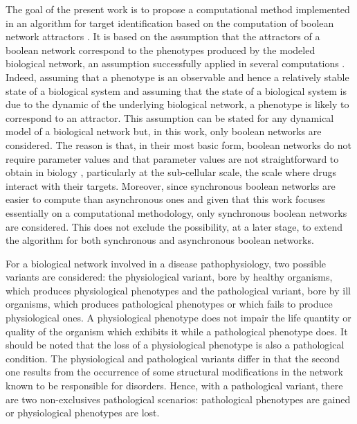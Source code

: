 \documentclass[oneside,a4paper,onecolumn,notitlepage]{article}
\begin{document}
The goal of the present work is to propose a computational method implemented in an algorithm for target identification based on the computation of boolean network attractors \cite{bornholdt2008boolean}. It is based on the assumption that the attractors of a boolean network correspond to the phenotypes produced by the modeled biological network, an assumption successfully applied in several computations \cite{huang2000shape,davidich2008boolean,faure2006dynamical,fumia2013boolean,creixell2012navigating,baverstock2011comparison}. Indeed, assuming that a phenotype is an observable and hence a relatively stable state of a biological system and assuming that the state of a biological system is due to the dynamic of the underlying biological network, a phenotype is likely to correspond to an attractor. This assumption can be stated for any dynamical model of a biological network but, in this work, only boolean networks are considered. The reason is that, in their most basic form, boolean networks do not require parameter values and that parameter values are not straightforward to obtain in biology \cite{wynn2012logic}, particularly at the sub-cellular scale, the scale where drugs interact with their targets. Moreover, since synchronous boolean networks are easier to compute than asynchronous ones \cite{garg2008synchronous} and given that this work focuses essentially on a computational methodology, only synchronous boolean networks are considered. This does not exclude the possibility, at a later stage, to extend the algorithm for both synchronous and asynchronous boolean networks.

For a biological network involved in a disease pathophysiology, two possible variants are considered: the physiological variant, bore by healthy organisms, which produces physiological phenotypes and the pathological variant, bore by ill organisms, which produces pathological phenotypes or which fails to produce physiological ones. A physiological phenotype does not impair the life quantity or quality of the organism which exhibits it while a pathological phenotype does. It should be noted that the loss of a physiological phenotype is also a pathological condition. The physiological and pathological variants differ in that the second one results from the occurrence of some structural modifications in the network known to be responsible for disorders. Hence, with a pathological variant, there are two non-exclusives pathological scenarios: pathological phenotypes are gained or physiological phenotypes are lost.
\end{document}
